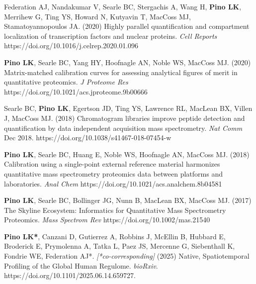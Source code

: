 \documentclass[11pt]{article}
\begin{document}
\begin{etaremune}
    \item Federation AJ, Nandakumar V, Searle BC, Stergachis A, Wang H, \textbf{Pino LK}, 
    Merrihew G, Ting YS, Howard N, Kutyavin T, MacCoss MJ, Stamatoyannopoulos JA. (2020) 
    Highly parallel quantification and compartment localization of transcription factors 
    and nuclear proteins. \textit{Cell Reports} 
    https://doi.org/10.1016/j.celrep.2020.01.096
    
    \item \textbf{Pino LK}, Searle BC, Yang HY, Hoofnagle AN, Noble WS, MacCoss MJ. 
    (2020) Matrix-matched calibration curves for assessing analytical figures of merit 
    in quantitative proteomics. \textit{J Proteome Res} 
    https://doi.org/10.1021/acs.jproteome.9b00666
    
    \item Searle BC, \textbf{Pino LK}, Egertson JD, Ting YS, Lawrence RL, MacLean BX, 
    Villen J, MacCoss MJ. (2018) Chromatogram libraries improve peptide detection and 
    quantification by data independent acquisition mass spectrometry. \textit{Nat Comm} 
    Dec 2018. https://doi.org/10.1038/s41467-018-07454-w
    
    \item \textbf{Pino LK}, Searle BC, Huang E, Noble WS, Hoofnagle AN, MacCoss MJ. 
    (2018) Calibration using a single-point external reference material harmonizes 
    quantitative mass spectrometry proteomics data between platforms and laboratories. 
    \textit{Anal Chem} https://doi.org/10.1021/acs.analchem.8b04581
    
    \item \textbf{Pino LK}, Searle BC, Bollinger JG, Nunn B, MacLean BX, MacCoss MJ. 
    (2017) The Skyline Ecosystem: Informatics for Quantitative Mass Spectrometry 
    Proteomics. \textit{Mass Spectrom Rev} https://doi.org/10.1002/mas.21540
    
\end{etaremune}

\begin{etaremune}

    \item \textbf{Pino LK*}, Canzani D, Gutierrez A, Robbins J, McEllin B, Hubbard E, Broderick E, Prymolenna A, Tatka L, Paez JS, Mercenne G, Siebenthall K, Fondrie WE, Federation AJ*. \textit{[*co-corresponding]} (2025) Native, Spatiotemporal Profiling of the Global Human Regulome. \textit{bioRxiv}. https://doi.org/10.1101/2025.06.14.659727.

\end{etaremune}
\end{document}
